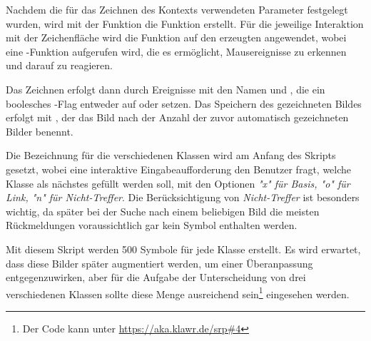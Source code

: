 Nachdem die für das Zeichnen des Kontexts verwendeten Parameter festgelegt wurden, wird mit der Funktion   die Funktion  erstellt.
Für die jeweilige Interaktion mit der Zeichenfläche wird die Funktion  auf den erzeugten  angewendet, wobei eine -Funktion aufgerufen wird, die es ermöglicht, Mausereignisse zu erkennen und darauf zu reagieren.

Das Zeichnen erfolgt dann durch Ereignisse mit den Namen  und , die ein boolesches -Flag entweder auf  oder  setzen.
Das Speichern des gezeichneten Bildes erfolgt mit , der das Bild nach der Anzahl der zuvor automatisch gezeichneten Bilder benennt.

Die Bezeichnung für die verschiedenen Klassen wird am Anfang des Skripts gesetzt, wobei eine interaktive Eingabeaufforderung den Benutzer fragt, welche Klasse als nächstes gefüllt werden soll, mit den Optionen \textit{"x" für Basis, "o" für Link, "n" für Nicht-Treffer}.
Die Berücksichtigung von \textit{Nicht-Treffer} ist besonders wichtig, da später bei der Suche nach einem beliebigen Bild die meisten Rückmeldungen voraussichtlich gar kein Symbol enthalten werden.

Mit diesem Skript werden 500 Symbole für jede Klasse erstellt.
Es wird erwartet, dass diese Bilder später augmentiert werden, um einer Überanpassung entgegenzuwirken, aber für die Aufgabe der Unterscheidung von drei verschiedenen Klassen sollte diese Menge ausreichend sein\footnote{Der Code kann unter \url{https://aka.klawr.de/srp\#4}} eingesehen werden.

